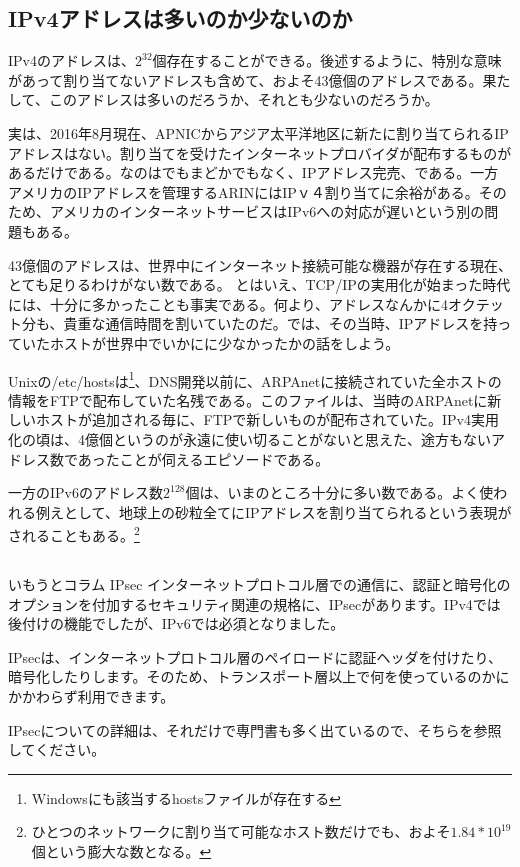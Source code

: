 \subsection{IPv4アドレスは多いのか少ないのか}
IPv4のアドレスは、$2^{32}$個存在することができる。後述するように、特別な意味があって割り当てないアドレスも含めて、およそ43億個のアドレスである。果たして、このアドレスは多いのだろうか、それとも少ないのだろうか。

実は、2016年8月現在、APNICからアジア太平洋地区に新たに割り当てられるIPアドレスはない。割り当てを受けたインターネットプロバイダが配布するものがあるだけである。なのはでもまどかでもなく、IPアドレス完売、である。一方アメリカのIPアドレスを管理するARINにはIPｖ４割り当てに余裕がある。そのため、アメリカのインターネットサービスはIPv6への対応が遅いという別の問題もある。

43億個のアドレスは、世界中にインターネット接続可能な機器が存在する現在、とても足りるわけがない数である。
とはいえ、TCP/IPの実用化が始まった時代には、十分に多かったことも事実である。何より、アドレスなんかに4オクテット分も、貴重な通信時間を割いていたのだ。では、その当時、IPアドレスを持っていたホストが世界中でいかにに少なかったかの話をしよう。

Unixの/etc/hostsは\footnote{Windowsにも該当するhostsファイルが存在する}、DNS開発以前に、ARPAnetに接続されていた全ホストの情報をFTPで配布していた名残である。このファイルは、当時のARPAnetに新しいホストが追加される毎に、FTPで新しいものが配布されていた。IPv4実用化の頃は、4億個というのが永遠に使い切ることがないと思えた、途方もないアドレス数であったことが伺えるエピソードである。

一方のIPv6のアドレス数$2^{128}$個は、いまのところ十分に多い数である。よく使われる例えとして、地球上の砂粒全てにIPアドレスを割り当てられるという表現がされることもある。\footnote{ひとつのネットワークに割り当て可能なホスト数だけでも、およそ$1.84*10^{19}$個という膨大な数となる。}

\subsection*{}
\begin{itembox}[l]{いもうとコラム IPsec}
インターネットプロトコル層での通信に、認証と暗号化のオプションを付加するセキュリティ関連の規格に、IPsecがあります。IPv4では後付けの機能でしたが、IPv6では必須となりました。

IPsecは、インターネットプロトコル層のペイロードに認証ヘッダを付けたり、暗号化したりします。そのため、トランスポート層以上で何を使っているのかにかかわらず利用できます。

IPsecについての詳細は、それだけで専門書も多く出ているので、そちらを参照してください。


\end{itembox}